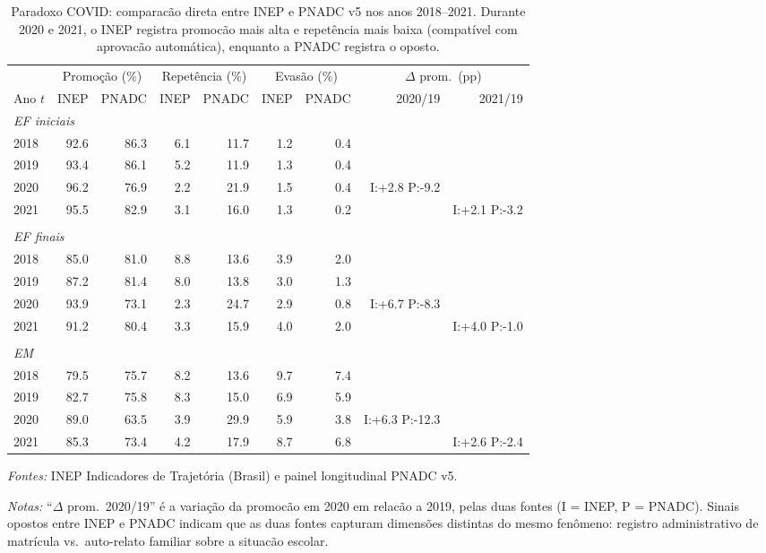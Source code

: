 \begin{table}[htbp]\centering
\caption{Paradoxo COVID: comparac\~ao direta entre INEP e PNADC v5 nos anos 2018--2021. Durante 2020 e 2021, o INEP registra promoc\~ao mais alta e repet\^encia mais baixa (compat\'ivel com aprovac\~ao autom\'atica), enquanto a PNADC registra o oposto.}
\label{tab:paradoxo_covid}
\begin{threeparttable}\small
\begin{tabular}{lrrrrrrrr}\toprule
& \multicolumn{2}{c}{Promo\c{c}\~ao (\%)} & \multicolumn{2}{c}{Repet\^encia (\%)} & \multicolumn{2}{c}{Evas\~ao (\%)} & \multicolumn{2}{c}{$\Delta$ prom.\ (pp)} \\
\cmidrule(lr){2-3} \cmidrule(lr){4-5} \cmidrule(lr){6-7} \cmidrule(lr){8-9}
Ano $t$ & INEP & PNADC & INEP & PNADC & INEP & PNADC & 2020/19 & 2021/19 \\
\midrule
\multicolumn{9}{l}{\textit{EF iniciais}} \\
\midrule
2018 & 92.6 & 86.3 & 6.1 & 11.7 & 1.2 & 0.4 & &  \\
2019 & 93.4 & 86.1 & 5.2 & 11.9 & 1.3 & 0.4 & &  \\
2020 & 96.2 & 76.9 & 2.2 & 21.9 & 1.5 & 0.4 & I:+2.8 P:-9.2 & \\
2021 & 95.5 & 82.9 & 3.1 & 16.0 & 1.3 & 0.2 & & I:+2.1 P:-3.2 \\
\\[0.3em]
\multicolumn{9}{l}{\textit{EF finais}} \\
\midrule
2018 & 85.0 & 81.0 & 8.8 & 13.6 & 3.9 & 2.0 & &  \\
2019 & 87.2 & 81.4 & 8.0 & 13.8 & 3.0 & 1.3 & &  \\
2020 & 93.9 & 73.1 & 2.3 & 24.7 & 2.9 & 0.8 & I:+6.7 P:-8.3 & \\
2021 & 91.2 & 80.4 & 3.3 & 15.9 & 4.0 & 2.0 & & I:+4.0 P:-1.0 \\
\\[0.3em]
\multicolumn{9}{l}{\textit{EM}} \\
\midrule
2018 & 79.5 & 75.7 & 8.2 & 13.6 & 9.7 & 7.4 & &  \\
2019 & 82.7 & 75.8 & 8.3 & 15.0 & 6.9 & 5.9 & &  \\
2020 & 89.0 & 63.5 & 3.9 & 29.9 & 5.9 & 3.8 & I:+6.3 P:-12.3 & \\
2021 & 85.3 & 73.4 & 4.2 & 17.9 & 8.7 & 6.8 & & I:+2.6 P:-2.4 \\
\bottomrule\end{tabular}
\begin{tablenotes}\footnotesize
\item \textit{Fontes:} INEP Indicadores de Trajet\'oria (Brasil) e painel longitudinal PNADC v5.
\item \textit{Notas:} ``$\Delta$ prom.\ 2020/19'' \'e a varia\c{c}\~ao da promoc\~ao em 2020 em relac\~ao a 2019, pelas duas fontes (I = INEP, P = PNADC). Sinais opostos entre INEP e PNADC indicam que as duas fontes capturam dimens\~oes distintas do mesmo fen\^omeno: registro administrativo de matr\'icula vs.\ auto-relato familiar sobre a situac\~ao escolar.
\end{tablenotes}\end{threeparttable}\end{table}
